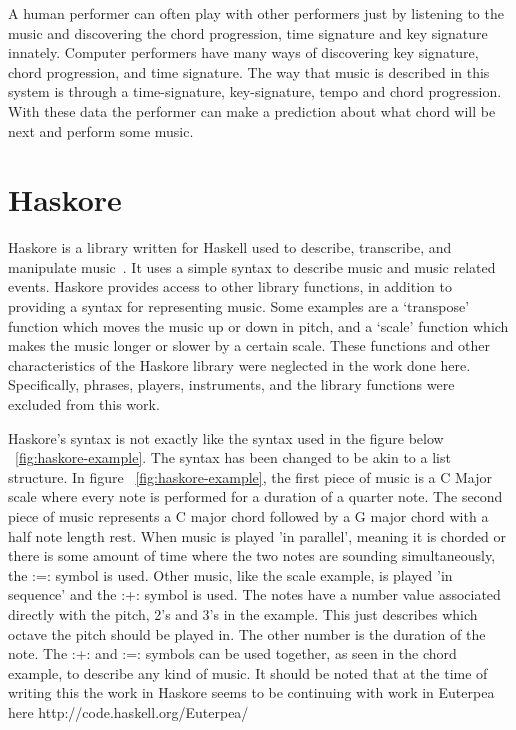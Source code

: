 \documentclass[12pt]{ucthesis}
\begin{document}
A human performer can often play with other performers just by listening to the music and discovering the chord progression, time signature and key signature innately. Computer performers have many ways of discovering key signature, chord progression, and time signature. The way that music is described in this system is through a time-signature, key-signature, tempo and chord progression. With these data the performer can make a prediction about what chord will be next and perform some music.

\section{Haskore}
\label{rw:haskore}

Haskore is a library written for Haskell used to describe, transcribe, and manipulate music~\cite{Haskore}. It uses a simple syntax to describe music and music related events. Haskore provides access to other library functions, in addition to providing a syntax for representing music. Some examples are a `transpose' function which moves the music up or down in pitch, and a `scale' function which makes the music longer or slower by a certain scale. These functions and other characteristics of the Haskore library were neglected in the work done here. Specifically, phrases, players, instruments, and the library functions were excluded from this work. 

Haskore's syntax is not exactly like the syntax used in the figure below ~\ref{fig:haskore-example}. The syntax has been changed to be akin to a list structure. In figure ~\ref{fig:haskore-example}, the first piece of music is a C Major scale where every note is performed for a duration of a quarter note. The second piece of music represents a C major chord followed by a G major chord with a half note length rest. When music is played 'in parallel', meaning it is chorded or there is some amount of time where the two notes are sounding simultaneously, the :=: symbol is used. Other music, like the scale example, is played 'in sequence' and the :+: symbol is used. The notes have a number value associated directly with the pitch, 2's and 3's in the example. This just describes which octave the pitch should be played in. The other number is the duration of the note. The :+: and :=: symbols can be used together, as seen in the chord example, to describe any kind of music. It should be noted that at the time of writing this the work in Haskore seems to be continuing with work in Euterpea here http://code.haskell.org/Euterpea/
\end{document}
